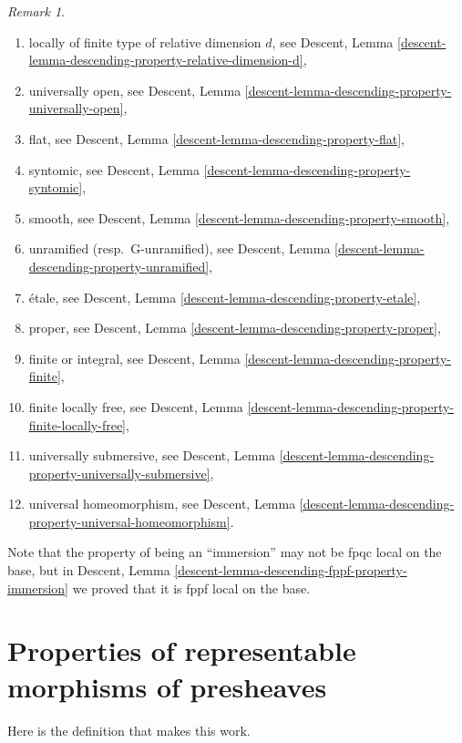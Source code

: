\documentclass{stacks-project}
\theoremstyle{plain}
\theoremstyle{definition}
\theoremstyle{remark}
\newtheorem{remark}[subsection]{Remark}
\numberwithin{equation}{subsection}
\begin{document}
\begin{remark}
\begin{enumerate}
\ref{descent-lemma-descending-property-locally-finite-presentation}, and
\ref{descent-lemma-descending-property-finite-presentation},
\item locally of finite type of relative dimension $d$, see
Descent,
Lemma \ref{descent-lemma-descending-property-relative-dimension-d},
\item universally open, see
Descent, Lemma \ref{descent-lemma-descending-property-universally-open},
\item flat, see
Descent, Lemma \ref{descent-lemma-descending-property-flat},
\item syntomic, see
Descent, Lemma \ref{descent-lemma-descending-property-syntomic},
\item smooth, see
Descent, Lemma \ref{descent-lemma-descending-property-smooth},
\item unramified (resp.\ G-unramified), see
Descent, Lemma \ref{descent-lemma-descending-property-unramified},
\item \'etale, see
Descent, Lemma \ref{descent-lemma-descending-property-etale},
\item proper, see
Descent, Lemma \ref{descent-lemma-descending-property-proper},
\item finite or integral, see
Descent, Lemma \ref{descent-lemma-descending-property-finite},
\item finite locally free, see
Descent, Lemma \ref{descent-lemma-descending-property-finite-locally-free},
\item universally submersive, see
Descent, Lemma \ref{descent-lemma-descending-property-universally-submersive},
\item universal homeomorphism, see
Descent, Lemma \ref{descent-lemma-descending-property-universal-homeomorphism}.
\end{enumerate}
Note that the property of being an ``immersion'' may not be fpqc local
on the base, but in
Descent, Lemma \ref{descent-lemma-descending-fppf-property-immersion}
we proved that it is fppf local on the base.
\end{remark}








\section{Properties of representable morphisms of presheaves}
\label{section-representable-properties}

\noindent
Here is the definition that makes this work.
\end{document}
